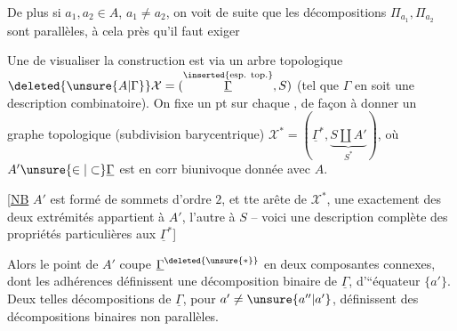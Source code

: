 
De plus si $a_1,a_2\in A$, $a_1\ne a_2$, on voit de suite que les décompositions $\Pi_{a_1},\Pi_{a_2}$ sont  parallèles, à cela près qu'il faut exiger %

Une  de visualiser la construction est via un arbre topologique $\deleted{\unsure{A|\Gamma}}\mathcal{X}=(\overset{\text{\inserted{esp. top.}}}{\underline{\Gamma}},S)$ (tel que $\Gamma$ en soit une description combinatoire). On fixe un pt sur chaque , de façon à donner un graphe topologique (subdivision barycentrique) $\mathcal{X}^{\ast}=(\underline{\Gamma}^{\ast},\underbrace{S\amalg A'}_{S^{\ast}})$, où $A'\unsure{\in|\subset}\underline{\Gamma}$ est en corr biunivoque donnée avec  $A$.

 [\uline{NB} $A'$ est formé de  sommets d'ordre $2$, et  tte arête de $\mathcal{X}^{\ast}$, une exactement des deux extrémités appartient à $A'$, l'autre à $S$ -- voici une description complète des propriétés particulières aux $\underline{\Gamma}^{\ast}$]

Alors le point  de $A'$ coupe $\underline{\Gamma}^{\deleted{\unsure{\ast}}}$ en deux composantes connexes, dont les adhérences définissent une décomposition binaire de $\underline{\Gamma}$, d'``équateur $\{a'\}$. Deux telles décompositions  de $\underline{\Gamma}$, pour $a'\ne\unsure{a''|a'}$, définissent des décompositions binaires  non parallèles.
